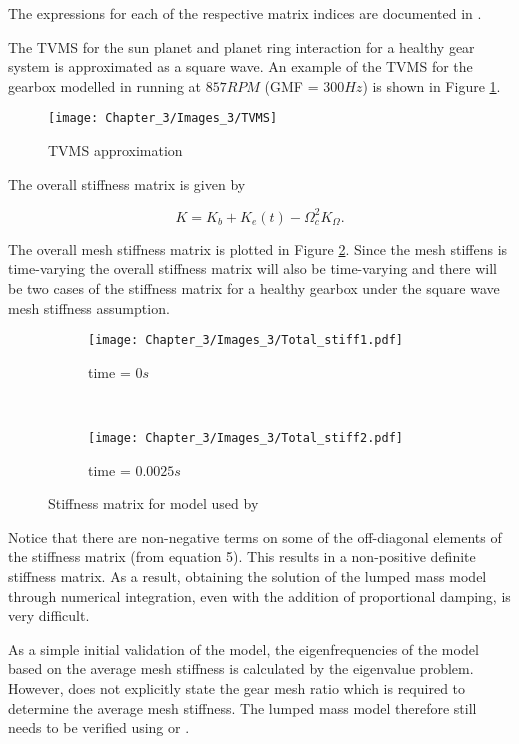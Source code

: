 The expressions for each of the respective matrix indices are documented in \cite{Chaari2006}.


The TVMS for the sun planet and planet ring interaction for a healthy gear system is approximated as a square wave. An example of the TVMS for the gearbox modelled in \cite{Chaari2006} running at $857RPM$ (GMF = $300Hz$) is shown in Figure \ref{F:TVMS}.


\begin{figure}[H]
	\centering
	\texttt{[image: Chapter\_3/Images\_3/TVMS]}
	\caption{TVMS approximation}
	\label{F:TVMS}
\end{figure}


The overall stiffness matrix is given by

\begin{equation}
K = K_{b}+K_{e}(t)-\Omega_{c}^{2} K_{\Omega}.
\end{equation}

The overall mesh stiffness matrix is plotted in Figure \ref{F:Stiffness}. Since the mesh stiffens is time-varying the overall stiffness matrix will also be time-varying and there will be two cases of the stiffness matrix for a healthy gearbox under the square wave mesh stiffness assumption. 

\begin{figure}[H]
	\centering
	\begin{subfigure}{0.49\textwidth}
		\texttt{[image: Chapter\_3/Images\_3/Total\_stiff1.pdf]}
		\caption{time = $0s$ }
	\end{subfigure}
	~
	\begin{subfigure}{0.49\textwidth}
		\texttt{[image: Chapter\_3/Images\_3/Total\_stiff2.pdf]}
		\caption{time = $0.0025s$ }
	\end{subfigure}
	
	\caption{Stiffness matrix for model used by \cite{Chaari2006}}
	\label{F:Stiffness}
\end{figure}

Notice that there are non-negative terms on some of the off-diagonal elements of the stiffness matrix (from \cite{Chaari2006} equation 5). This results in a non-positive definite stiffness matrix. As a result, obtaining the solution of the lumped mass model through numerical integration, even with the addition of proportional damping, is very difficult.  

As a simple initial validation of the model, the eigenfrequencies of the model based on the average mesh stiffness is calculated by the eigenvalue problem. However, \cite{Chaari2006} does not explicitly state the gear mesh ratio which is required to determine the average mesh stiffness. The lumped mass model therefore still needs to be verified using \cite{Chaari2006} or \cite{Lin1999}.



